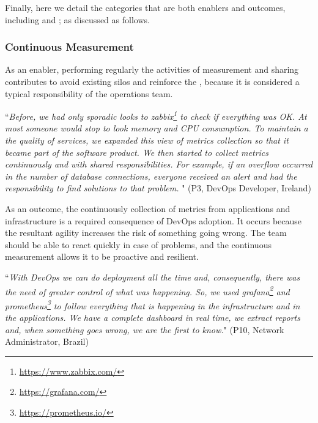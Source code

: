 Finally, here we detail the categories that are both enablers
and outcomes, including 
and ; as discussed as follows.

\subsubsection{Continuous Measurement}

As an enabler, performing regularly the
activities of measurement and sharing
contributes to avoid existing silos and reinforce the \cc, because it is
considered a typical responsibility of the operations team.

\begin{mq}
``\emph{Before, we had only sporadic looks to
zabbix\footnote{\url{https://www.zabbix.com/}} to check if everything was OK.
At most someone would stop to look memory and CPU consumption. To maintain a
the quality of services, we expanded this view of metrics collection so that it
became part of the software product. We then started to collect metrics continuously
and with shared responsibilities. For example, if an overflow occurred in the
number of database connections, everyone received an alert and had
the responsibility to find solutions to that problem. %
}" (P3, DevOps Developer, Ireland)
\end{mq}

As an outcome, the continuously collection of metrics from applications and
infrastructure is a required consequence of DevOps adoption. It occurs because
the resultant agility increases the risk of something going wrong. The team
should be able to react quickly in case of problems, and the continuous
measurement allows it to be proactive and resilient.

\begin{mq}
``\emph{With DevOps we can do deployment all the time and, consequently, there was
the need of greater control of what was happening. So, we used
grafana\footnote{\url{https://grafana.com/}} and
prometheus\footnote{\url{https://prometheus.io/}} to follow everything that is
happening in the infrastructure and in the applications. We have a complete
dashboard in real time, we extract reports and, when something goes wrong, we
are the first to know.}" (P10, Network Administrator, Brazil)
\end{mq}

